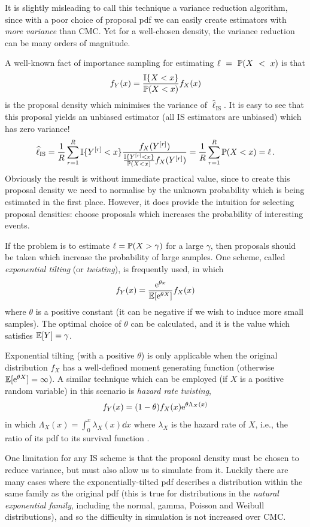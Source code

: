 It is slightly misleading to call this technique a variance reduction algorithm, since with a poor choice of proposal pdf we can easily create estimators with \emph{more variance} than CMC. Yet for a well-chosen density, the variance reduction can be many orders of magnitude.

A well-known fact of importance sampling for estimating $\ell~=~\operatorname{{\mathbb P}}(X~<~x)$ is that
\[ f_Y(x) = \frac{\mathbb{I}\{  X < x  \}}{\operatorname{{\mathbb P}}(X < x)} f_X(x) \]
is the proposal density which minimises the variance of $\hat{\ell}_{\mathrm{IS}}$. It is easy to see that this proposal yields an unbiased estimator (all IS estimators are unbiased) which has zero variance!
\[ \widehat{\ell}_{\mathrm{IS}} = \frac1R \sum_{r=1}^R \mathbb{I}\{  Y^{[r]} < x  \} \frac{f_X(Y^{[r]})}{ \frac{\mathbb{I}\{  Y^{[r]} < x  \}}{\operatorname{{\mathbb P}}(X<x)} f_X(Y^{[r]})} = \frac1R \sum_{r=1}^R \operatorname{{\mathbb P}}(X<x) = \ell \,. \]
Obviously the result is without immediate practical value, since to create this proposal density we need to normalise by the unknown probability which is being estimated in the first place. However, it does provide the intuition for selecting proposal densities: choose proposals which increases the probability of interesting events.

If the problem is to estimate $\ell = \operatorname{{\mathbb P}}(X > \gamma)$ for a large $\gamma$, then proposals should be taken which increase the probability of large samples. One scheme, called \emph{exponential tilting} (or \emph{twisting}), is frequently used, in which
\begin{equation} \label{def-exp-tilting}
f_Y(x) = \frac{\mathrm{e}^{\theta x}}{\operatorname{{\mathbb E}}[\mathrm{e}^{\theta X}]} f_X(x)
\end{equation}
where $\theta$ is a positive constant (it can be negative if we wish to induce more small samples). The optimal choice of $\theta$ can be calculated, and it is the value which satisfies $\operatorname{{\mathbb E}}[Y] = \gamma$.

Exponential tilting (with a positive $\theta$) is only applicable when the original distribution $f_X$ has a well-defined moment generating function (otherwise $\operatorname{{\mathbb E}}[\mathrm{e}^{\theta X}] = \infty$). A similar technique which can be employed (if $X$ is a positive random variable) in this scenario is \emph{hazard rate twisting},
\[ f_Y(x) = (1-\theta) f_X(x) \mathrm{e}^{\theta \Lambda_X(x)} \]
in which $\Lambda_X(x) = \int_0^x \lambda_X(x) \dd x$ where $\lambda_X$ is the hazard rate of $X$, i.e., the ratio of its pdf to its survival function \cite{juneja2002simulating}.

One limitation for any IS scheme is that the proposal density must be chosen to reduce variance, but must also allow us to simulate from it. Luckily there are many cases where the exponentially-tilted pdf describes a distribution within the same family as the original pdf (this is true for distributions in the \emph{natural exponential family}, including the normal, gamma, Poisson and Weibull distributions), and so the difficulty in simulation is not increased over CMC.

